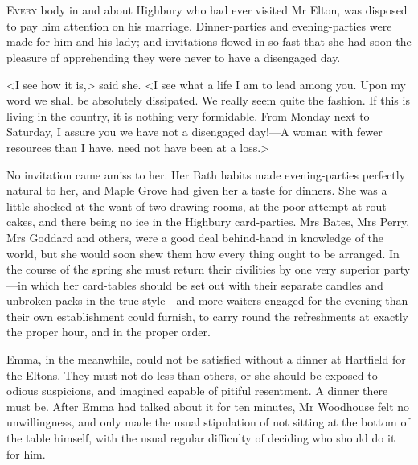 \chapter[Chapter \thechapter]{}
\lettrine[lraise=0.3]{E}{very} body in and about Highbury who had ever visited Mr Elton, was disposed to pay him attention on his marriage. Dinner-parties and evening-parties were made for him and his lady; and invitations flowed in so fast that she had soon the pleasure of apprehending they were never to have a disengaged day.

<I see how it is,> said she. <I see what a life I am to lead among you. Upon my word we shall be absolutely dissipated. We really seem quite the fashion. If this is living in the country, it is nothing very formidable. From Monday next to Saturday, I assure you we have not a disengaged day!—A woman with fewer resources than I have, need not have been at a loss.>

No invitation came amiss to her. Her Bath habits made evening-parties perfectly natural to her, and Maple Grove had given her a taste for dinners. She was a little shocked at the want of two drawing rooms, at the poor attempt at rout-cakes, and there being no ice in the Highbury card-parties. Mrs Bates, Mrs Perry, Mrs Goddard and others, were a good deal behind-hand in knowledge of the world, but she would soon shew them how every thing ought to be arranged. In the course of the spring she must return their civilities by one very superior party—in which her card-tables should be set out with their separate candles and unbroken packs in the true style—and more waiters engaged for the evening than their own establishment could furnish, to carry round the refreshments at exactly the proper hour, and in the proper order.

Emma, in the meanwhile, could not be satisfied without a dinner at Hartfield for the Eltons. They must not do less than others, or she should be exposed to odious suspicions, and imagined capable of pitiful resentment. A dinner there must be. After Emma had talked about it for ten minutes, Mr Woodhouse felt no unwillingness, and only made the usual stipulation of not sitting at the bottom of the table himself, with the usual regular difficulty of deciding who should do it for him.

